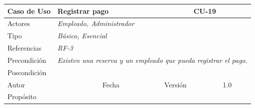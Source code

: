 \begin{table}[H]
    \begin{tabular}{|llllllll|}
    \hline
    \multicolumn{1}{|l|}{Caso de Uso}       & \multicolumn{5}{l|}{Registrar pago}                                                                          & \multicolumn{2}{l|}{\cellcolor[HTML]{E6E6E6}CU-19}          \\ \hline
    \multicolumn{1}{|l|}{Actores}           & \multicolumn{7}{l|}{{\color[HTML]{808080} \textit{Empleado, Administrador}}}                                                                                                                           \\ \hline
    \multicolumn{1}{|l|}{Tipo}              & \multicolumn{7}{l|}{{\color[HTML]{808080} \textit{Básico, Esencial}}}                                                                                                                \\ \hline
    \multicolumn{1}{|l|}{Referencias}       & \multicolumn{2}{l|}{{\color[HTML]{808080} \textit{RF-3}}}              & \multicolumn{5}{l|}{}                                                                                       \\ \hline
    \multicolumn{1}{|l|}{Precondición}      & \multicolumn{7}{l|}{{\color[HTML]{808080} \textit{Existen una reserva y un empleado que pueda registrar el pago.}}}                                                                                                \\ \hline
    \multicolumn{1}{|l|}{Poscondición}      & \multicolumn{7}{l|}{}                                                                                                                                                                  \\ \hline
    \multicolumn{1}{|l|}{Autor}             & \multicolumn{1}{l|}{}                        & \multicolumn{2}{l|}{Fecha}           & \multicolumn{1}{l|}{}     & \multicolumn{2}{l|}{Versión}         & 1.0                           \\ \hline
    \multicolumn{8}{|l|}{\cellcolor[HTML]{F2F2F2}Propósito}                                                                                                                                                                          \\ \hline

\end{tabular}
\end{table}
